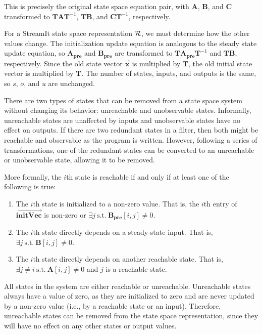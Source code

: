 This is precisely the original state space equation pair,
with $\mathbf{A}$, $\mathbf{B}$, and $\mathbf{C}$ transformed to
$\mathbf{T} \mathbf{A} \mathbf{T}^{-1}$, $\mathbf{T} \mathbf{B}$,
and $\mathbf{C} \mathbf{T}^{-1}$, respectively.

For a StreamIt state space representation $\cal{R}$, we must
determine how the other values change. The initialization update
equation is analogous to the steady state update equation,
so $\mathbf{A_{pre}}$ and $\mathbf{B_{pre}}$ are transformed to
$\mathbf{T} \mathbf{A_{pre}} \mathbf{T}^{-1}$ and $\mathbf{T}
\mathbf{B}$, respectively. Since the old state vector
$\vec{\mathbf{x}}$ is multiplied by $\mathbf{T}$, the old initial
state vector is multiplied by $\mathbf{T}$. The number of states,
inputs, and outputs is the same, so $s$, $o$, and $u$ are unchanged.

\label{sec:state-removal}

There are two types of states that can be removed from a state space
system without changing its behavior: unreachable and unobservable
states.  Informally, unreachable states are unaffected by inputs and
unobservable states have no effect on outputs.  If there are two
redundant states in a filter, then both might be reachable and
observable as the program is written.  However, following a series of
transformations, one of the redundant states can be converted to an
unreachable or unobservable state, allowing it to be removed.

More formally, the $i$th state is reachable if and only if at least
one of the following is true:
\begin{enumerate}
\item The $i$th state is initialized to a non-zero value.  That is,
the $i$th entry of $\overrightarrow{\mathbf{initVec}}$ is non-zero or
$\exists j~\mbox{s.t.}~\mathbf{B_{pre}}[i,j] \ne 0$.

\item The $i$th state directly depends on a steady-state input.  That
is, $\exists j~\mbox{s.t.}~\mathbf{B}[i,j] \ne 0$.

\item The $i$th state directly depends on another reachable state.
That is, $\exists j \ne i~\mbox{s.t.}~\mathbf{A}[i,j] \ne 0$ and $j$ is a
reachable state.
\end{enumerate}
All states in the system are either reachable or unreachable.
Unreachable states always have a value of zero, as they are
initialized to zero and are never updated by a non-zero value (i.e.,
by a reachable state or an input).  Therefore, unreachable states can
be removed from the state space representation, since they will have
no effect on any other states or output values.

